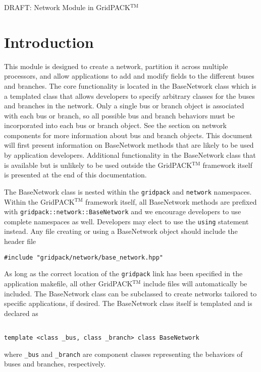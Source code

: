 \documentclass[12pt]{article}
\begin{document}
\newcommand{\tmsym}{^{\mbox{TM}}}
\begin{titlepage}
\begin{center}
{\LARGE DRAFT: Network Module in GridPACK$\tmsym$}
\end{center}
\end{titlepage}
\newpage
\pagestyle{plain}
\section{Introduction}
This module is designed to create a network, partition it across multiple
processors, and allow applications to add and modify fields to the different
buses and branches. The core functionality is located in the BaseNetwork class
which is a templated class that allows developers to specify arbitrary classes
for the buses and branches in the network. Only a single bus or branch object is
associated with each bus or branch, so all possible bus and branch behaviors
must be incorporated into each bus or branch object. See the section on network
components for more information about bus and branch objects. This document will
first present information on BaseNetwork methods that are likely to be used by
application developers. Additional functionality in the BaseNetwork class that
is available but is unlikely to be used outside the GridPACK$\tmsym$ framework
itself is presented at the end of this documentation.

The BaseNetwork class is nested within the \texttt{gridpack} and \texttt{network}
namespaces. Within the GridPACK$\tmsym$ framework itself, all BaseNetwork
methods are prefixed with \texttt{gridpack::network::BaseNetwork} and we encourage
developers to use complete namespaces as well. Developers may elect to use the
\texttt{using} statement instead. Any file creating or using a BaseNetwork object
should include the header file
\begin{verbatim}
#include "gridpack/network/base_network.hpp"
\end{verbatim}
As long as the correct location of the \texttt{gridpack} link has been specified
in the application makefile, all other GridPACK$\tmsym$ include files will
automatically be included.  The BaseNetwork class can be subclassed to create
networks tailored to specific applications, if desired. The BaseNetwork class
itself is templated and is declared as
\begin{verbatim}

template <class _bus, class _branch> class BaseNetwork

\end{verbatim}
where \texttt{\_bus} and \texttt{\_branch} are component classes representing
the behaviors of buses and branches, respectively.
\end{document}
